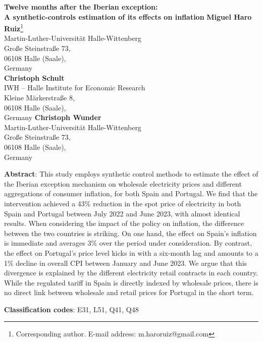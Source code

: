 \documentclass[12pt,a4paper]{article}
\begin{document}
\renewcommand{\thefootnote}{\fnsymbol{footnote}}
\begin{titlepage}
\begin{center}
    \LARGE
    \textbf{Twelve months after the Iberian exception:\\ A synthetic-controls estimation of its effects on inflation}
    \normalsize
    \vspace{1cm}
    \textbf{Miguel Haro Ruiz}\footnote{Corresponding author. E-mail address: m.haroruiz@gmail.com}\\
    \small
    Martin-Luther-Universität Halle-Wittenberg\\
    Große Steinstraße 73,\\
    06108 Halle (Saale),\\
    Germany\\
    \vspace{0.25cm}
    \normalsize
    \textbf{Christoph Schult}\\
    \small
    IWH – Halle Institute for Economic Research\\
    Kleine Märkerstraße 8,\\
    06108 Halle (Saale),\\
    Germany
    \vspace{0.25cm}
    \textbf{Christoph Wunder}\\
    \small
    Martin-Luther-Universität Halle-Wittenberg\\
    Große Steinstraße 73,\\
    06108 Halle (Saale),\\
    Germany\\
    \end{center}
    \vspace{0.75cm}
    \normalsize
    \textbf{Abstract}: This study employs synthetic control methods to estimate the effect of the Iberian exception mechanism on wholesale electricity prices and different aggregations of consumer inflation, for both Spain and Portugal. We find that the intervention achieved a 43\% reduction in the spot price of electricity in both Spain and Portugal between July 2022 and June 2023, with almost identical results. When considering the impact of the policy on inflation, the difference between the two countries is striking. On one hand, the effect on Spain's inflation is immediate and averages 3\% over the period under consideration. By contrast, the effect on Portugal’s price level kicks in with a six-month lag and amounts to a 1\% decline in overall CPI between January and June 2023. We argue that this divergence is explained by the different electricity retail contracts in each country. While the regulated tariff in Spain is directly indexed by wholesale prices, there is no direct link between wholesale and retail prices for Portugal in the short term.\par
    \textbf{Classification codes}: E31, L51, Q41, Q48
\end{titlepage}
\renewcommand{\thefootnote}{\arabic{footnote}}
\end{document}
